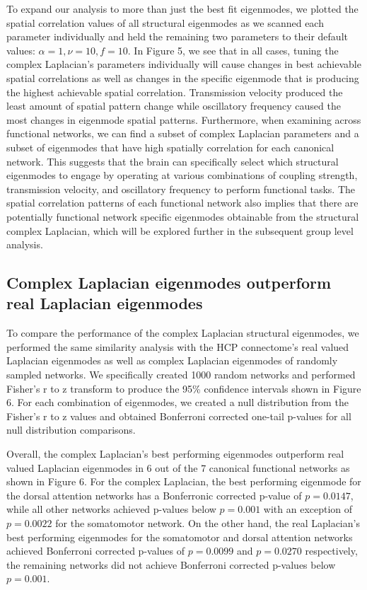 \documentclass{article}
\begin{document}
To expand our analysis to more than just the best fit eigenmodes, we plotted the spatial correlation values of all structural eigenmodes as we scanned each parameter individually and held the remaining two parameters to their default values: $\alpha = 1, \nu = 10, f = 10$. In Figure 5, we see that in all cases, tuning the complex Laplacian's parameters individually will cause changes in best achievable spatial correlations as well as changes in the specific eigenmode that is producing the highest achievable spatial correlation. Transmission velocity produced the least amount of spatial pattern change while oscillatory frequency caused the most changes in eigenmode spatial patterns. Furthermore, when examining across functional networks, we can find a subset of complex Laplacian parameters and a subset of eigenmodes that have high spatially correlation for each canonical network. This suggests that the brain can specifically select which structural eigenmodes to engage by operating at various combinations of coupling strength, transmission velocity, and oscillatory frequency to perform functional tasks. The spatial correlation patterns of each functional network also implies that there are potentially functional network specific eigenmodes obtainable from the structural complex Laplacian, which will be explored further in the subsequent group level analysis.

\subsection{Complex Laplacian eigenmodes outperform real Laplacian eigenmodes}
To compare the performance of the complex Laplacian structural eigenmodes, we performed the same similarity analysis with the HCP connectome's real valued Laplacian eigenmodes as well as complex Laplacian eigenmodes of randomly sampled networks. We specifically created 1000 random networks and performed Fisher's r to z transform to produce the 95\% confidence intervals shown in Figure 6. For each combination of eigenmodes, we created a null distribution from the Fisher's r to z values and obtained Bonferroni corrected one-tail p-values for all null distribution comparisons. 

Overall, the complex Laplacian's best performing eigenmodes outperform real valued Laplacian eigenmodes in 6 out of the 7 canonical functional networks as shown in Figure 6. For the complex Laplacian, the best performing eigenmode for the dorsal attention networks has a Bonferronic corrected p-value of $p = 0.0147$, while all other networks achieved p-values below $p = 0.001$ with an exception of $p = 0.0022$ for the somatomotor network. On the other hand, the real Laplacian's best performing eigenmodes for the somatomotor and dorsal attention networks achieved Bonferroni corrected p-values of $p = 0.0099$ and $p = 0.0270$ respectively, the remaining networks did not achieve Bonferroni corrected p-values below $p=0.001$. 
\end{document}
